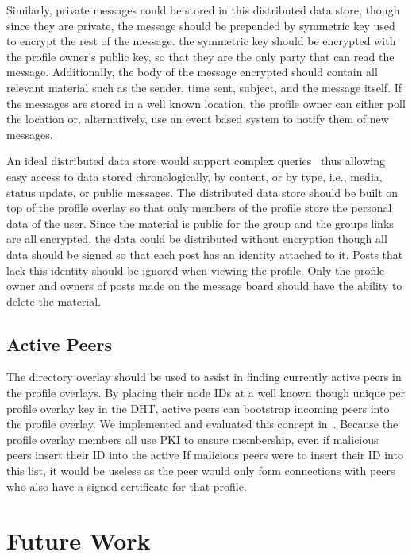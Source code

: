 \documentclass[letterpaper,twocolumn,10pt]{article}
\begin{document}
Similarly, private messages could be stored in this distributed data store,
though since they are private, the message should be prepended by symmetric
key used to encrypt the rest of the message.  the symmetric key should be
encrypted with the profile owner's public key, so that they are the only party
that can read the message.  Additionally, the body of the message encrypted
should contain all relevant material such as the sender, time sent, subject,
and the message itself.  If the messages are stored in a well known location,
the profile owner can either poll the location or, alternatively, use an event
based system to notify them of new messages.

An ideal distributed data store would support complex queries~\cite{complex_queries}
thus allowing easy access to data stored chronologically, by content, or by type,
i.e., media, status update, or public messages.  The distributed data store
should be built on top of the profile overlay so that only members of the
profile store the personal data of the user.  Since the material is public for
the group and the groups links are all encrypted, the data could be distributed
without encryption though all data should be signed so that each post has an
identity attached to it.  Posts that lack this identity should be ignored when
viewing the profile.  Only the profile owner and owners of posts made on the
message board should have the ability to delete the material.

\subsection{Active Peers}
The directory overlay should be used to assist in finding currently active peers
in the profile overlays.  By placing their node IDs at a well known though unique
per profile overlay key in the DHT, active peers can bootstrap incoming peers
into the profile overlay.  We implemented and evaluated this concept
in~\cite{icdcs10}.  Because the profile overlay members all use PKI to ensure
membership, even if malicious peers insert their ID into the active If malicious
peers were to insert their ID into this list, it would be useless as the peer
would only form connections with peers who also have a signed certificate for
that profile.

\section{Future Work}
\label{outstanding}
\end{document}
